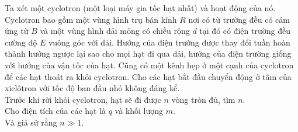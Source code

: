 \begin{vd}[Cyclotron]
Ta xét một cyclotron (một loại máy gia tốc hạt nhất) và hoạt động của nó. Cyclotron bao gồm một vùng hình trụ bán kính $R$ nơi có từ trường đều có cảm ứng từ $B$ và một vùng hình dải mỏng có chiều rộng $d$ tại đó có điện trường đều cường độ $E$ vuông góc với dải. Hướng của điện trường được thay đổi tuần hoàn thành hướng ngược lại sao cho mọi hạt đi qua dải, hướng của điện trường giống với hướng của vận tốc của hạt. Cũng có một kênh hẹp ở một cạnh của cyclotron để các hạt thoát ra khỏi cyclotron. Cho các hạt bắt đầu chuyển động ở tâm của xiclôtron với tốc độ ban đầu nhỏ không đáng kể.
\\Trước khi rời khỏi cyclotron, hạt sẽ đi được $n$ vòng tròn đủ, tìm $n$.
\\ Cho điện tích của các hạt là $q$ và khối lượng $m$.
\\Và giả sử rằng $n\gg1$.
\begin{center}
    


\begin{tikzpicture}[x=0.5pt,y=0.5pt,yscale=-1,xscale=1]


\end{tikzpicture}
\end{center}
\end{vd}
